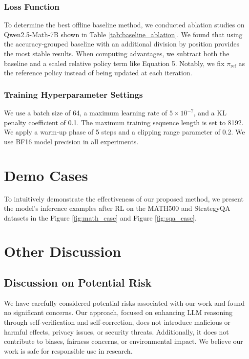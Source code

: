 \subsubsection{Loss Function}

To determine the best offline baseline method, we conducted ablation studies on Qwen2.5-Math-7B shown in Table \ref{tab:baseline_ablation}. We found that using the accuracy-grouped baseline with an additional division by position provides the most stable results. When computing advantages, we subtract both the baseline and a scaled relative policy term like Equation 5. Notably, we fix $\pi_{\text{ref}}$ as the reference policy instead of being updated at each iteration.

\subsubsection{Training Hyperparameter Settings}
We use a batch size of 64, a maximum learning rate of $5\times10^{-7}$, and a KL penalty coefficient of 0.1. The maximum training sequence length is set to 8192. We apply a warm-up phase of 5 steps and a clipping range parameter of 0.2. We use BF16 model precision in all experiments.





\section{Demo Cases}
\label{ap:case}

To intuitively demonstrate the effectiveness of our proposed method, we present the model's inference examples after RL on the MATH500 and StrategyQA datasets in the Figure \ref{fig:math_case} and Figure \ref{fig:sqa_case}.


\section{Other Discussion}
\subsection{Discussion on Potential Risk}
We have carefully considered potential risks associated with our work and found no significant concerns. Our approach, focused on enhancing LLM reasoning through self-verification and self-correction, does not introduce malicious or harmful effects, privacy issues, or security threats. Additionally, it does not contribute to biases, fairness concerns, or environmental impact. We believe our work is safe for responsible use in research.

